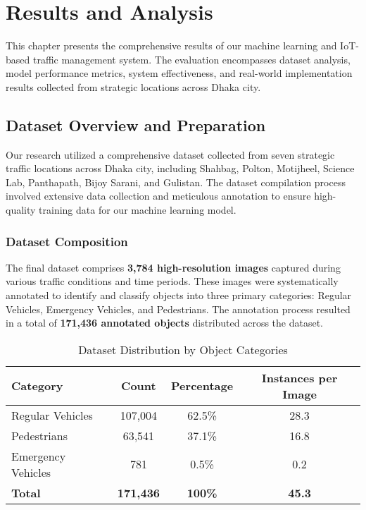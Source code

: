 \chapter{Results and Analysis}
\label{ch:results}

This chapter presents the comprehensive results of our machine learning and IoT-based traffic management system. The evaluation encompasses dataset analysis, model performance metrics, system effectiveness, and real-world implementation results collected from strategic locations across Dhaka city.

\section{Dataset Overview and Preparation}
\label{sec:dataset_overview}

Our research utilized a comprehensive dataset collected from seven strategic traffic locations across Dhaka city, including Shahbag, Polton, Motijheel, Science Lab, Panthapath, Bijoy Sarani, and Gulistan. The dataset compilation process involved extensive data collection and meticulous annotation to ensure high-quality training data for our machine learning model.

\subsection{Dataset Composition}
The final dataset comprises \textbf{3,784 high-resolution images} captured during various traffic conditions and time periods. These images were systematically annotated to identify and classify objects into three primary categories: Regular Vehicles, Emergency Vehicles, and Pedestrians. The annotation process resulted in a total of \textbf{171,436 annotated objects} distributed across the dataset.

\begin{table}[h]
\centering
\caption{Dataset Distribution by Object Categories}
\label{tab:dataset_distribution}
\begin{tabular}{|l|c|c|c|}
\hline
\textbf{Category} & \textbf{Count} & \textbf{Percentage} & \textbf{Instances per Image} \\
\hline
Regular Vehicles & 107,004 & 62.5\% & 28.3 \\
Pedestrians & 63,541 & 37.1\% & 16.8 \\
Emergency Vehicles & 781 & 0.5\% & 0.2 \\
\hline
\textbf{Total} & \textbf{171,436} & \textbf{100\%} & \textbf{45.3} \\
\hline
\end{tabular}
\end{table}

